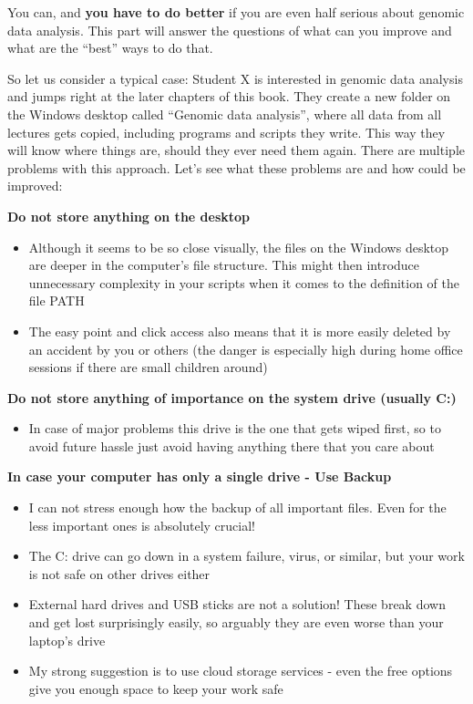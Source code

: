 \documentclass[]{book}
\providecommand{\tightlist}{%
  \setlength{\itemsep}{0pt}\setlength{\parskip}{0pt}}
\begin{document}
You can, and \textbf{you have to do better} if you are even half serious
about genomic data analysis. This part will answer the questions of what
can you improve and what are the ``best'' ways to do that.

So let us consider a typical case: Student X is interested in genomic
data analysis and jumps right at the later chapters of this book. They
create a new folder on the Windows desktop called ``Genomic data
analysis'', where all data from all lectures gets copied, including
programs and scripts they write. This way they will know where things
are, should they ever need them again. There are multiple problems with
this approach. Let's see what these problems are and how could be
improved:

\textbf{Do not store anything on the desktop}

\begin{itemize}
\tightlist
\item
  Although it seems to be so close visually, the files on the Windows
  desktop are deeper in the computer's file structure. This might then
  introduce unnecessary complexity in your scripts when it comes to the
  definition of the file PATH
\item
  The easy point and click access also means that it is more easily
  deleted by an accident by you or others (the danger is especially high
  during home office sessions if there are small children around)
\end{itemize}

\textbf{Do not store anything of importance on the system drive (usually
C:)}

\begin{itemize}
\tightlist
\item
  In case of major problems this drive is the one that gets wiped first,
  so to avoid future hassle just avoid having anything there that you
  care about
\end{itemize}

\textbf{In case your computer has only a single drive - Use Backup}

\begin{itemize}
\tightlist
\item
  I can not stress enough how the backup of all important files. Even
  for the less important ones is absolutely crucial!
\item
  The C: drive can go down in a system failure, virus, or similar, but
  your work is not safe on other drives either
\item
  External hard drives and USB sticks are not a solution! These break
  down and get lost surprisingly easily, so arguably they are even worse
  than your laptop's drive
\item
  My strong suggestion is to use cloud storage services - even the free
  options give you enough space to keep your work safe
\end{itemize}
\end{document}
